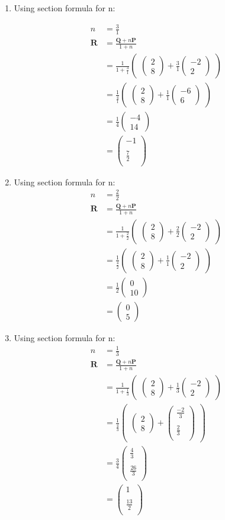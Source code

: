 \documentclass[12pt]{article}
\newcommand{\myvec}[1]{\ensuremath{\begin{pmatrix}#1\end{pmatrix}}}
\let\vec\mathbf
\begin{document}
\begin{enumerate}


\item Using section formula for n:
    
\begin{align}
n&=\frac{3}{1}\\
\vec{R}&=\frac{\vec{Q}+n\vec{P}}{1+n}\\
&=\frac{1}{1+\frac{3}{1}}  \myvec{\myvec{
2\\
8
}
  +
   \frac{3}{1}\myvec{
-2\\
2
}}\\
&= \frac{1}{\frac{4}{1}} \myvec{\myvec{
2\\
8
}
  +
\frac{1}{1}\myvec{
-6\\
6
}} \\
&=\frac{1}{4}
\myvec{
-4\\
14
}\\
&=\myvec{
-1\\
\\
\frac{7}{2}\\
}
\end{align}

\item Using section formula for n:
\begin{align}
n&=\frac{2}{2}\\
\vec{R}&=\frac{\vec{Q}+n\vec{P}}{1+n}\\
&=\frac{1}{1+\frac{2}{2}}  \myvec{\myvec{
2\\
8
}
  +
   \frac{2}{2}\myvec{
-2\\
2
}}\\
&= \frac{1}{\frac{4}{2}} \myvec{\myvec{
2\\
8
}
  +
\frac{1}{1}\myvec{
-2\\
2
}} \\
&=\frac{1}{2}
\myvec{
0\\
10
}\\
&=\myvec{
0\\
5
}
\end{align}

\item Using section formula for n:
\begin{align}
n&=\frac{1}{3}\\
\vec{R}&=\frac{\vec{Q}+n\vec{P}}{1+n}\\
&=\frac{1}{1+\frac{1}{3}}  \myvec{\myvec{
2\\
8
}
  +
   \frac{1}{3}\myvec{
-2\\
2
}}\\
&= \frac{1}{\frac{4}{3}} \myvec{\myvec{
2\\
8
}
  +
\myvec{
\frac{-2}{3}\\
\\
\frac{2}{3}\\
}} \\
&=\frac{3}{4}
\myvec{
\frac{4}{3}\\
\\
\frac{26}{3}\\
}\\
&=\myvec{
1\\
\\
\frac{13}{2}\\
}
\end{align}


\end{enumerate}
\end{document}
